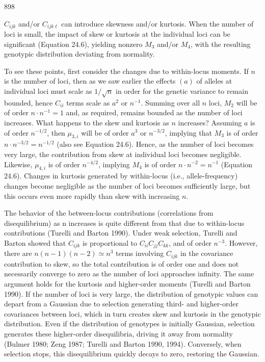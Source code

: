 \documentclass{article}
\begin{document}
898

 $ C_{ijk} $ and/or  $ C_{ijk\ell} $ can introduce skewness and/or kurtosis. When the number of loci is small, the impact of skew or kurtosis at the individual loci can be significant (Equation 24.6), yielding nonzero  $ M_3 $ and/or  $ M_4 $, with the resulting genotypic distribution deviating from normality.

To see these points, first consider the changes due to within-locus moments. If  $ n $ is the number of loci, then as we saw earlier the effects  $ (a) $ of alleles at individual loci must scale as  $ 1/\sqrt{n} $ in order for the genetic variance to remain bounded, hence  $ C_{ii} $ terms scale as  $ a^2 $ or  $ n^{-1} $. Summing over all  $ n $ loci,  $ M_2 $ will be of order  $ n \cdot n^{-1} = 1 $ and, as required, remains bounded as the number of loci increases. What happens to the skew and kurtosis as  $ n $ increases? Assuming  $ a $ is of order  $ n^{-1/2} $, then  $ \mu_{3,i} $ will be of order  $ a^3 $ or  $ n^{-3/2} $, implying that  $ M_3 $ is of order  $ n \cdot n^{-3/2} = n^{-1/2} $ (also see Equation 24.6). Hence, as the number of loci becomes very large, the contribution from skew at individual loci becomes negligible. Likewise,  $ \mu_{4,i} $ is of order  $ n^{-4/2} $, implying  $ M_4 $ is of order  $ n \cdot n^{-2} = n^{-1} $ (Equation 24.6). Changes in kurtosis generated by within-locus (i.e., allele-frequency) changes become negligible as the number of loci becomes sufficiently large, but this occurs even more rapidly than skew with increasing  $ n $.

The behavior of the between-locus contributions (correlations from disequilibrium) as n increases is quite different from that due to within-locus contributions (Turelli and Barton 1990). Under weak selection, Turelli and Barton showed that  $ C_{ijk} $ is proportional to  $ C_{ii}C_{jj}C_{kk} $, and of order  $ n^{-3} $. However, there are  $ n(n-1)(n-2) \simeq n^{3} $ terms involving  $ C_{ijk} $ in the covariance contribution to skew, so the total contribution is of order one and does not necessarily converge to zero as the number of loci approaches infinity. The same argument holds for the kurtosis and higher-order moments (Turelli and Barton 1990). If the number of loci is very large, the distribution of genotypic values can depart from a Gaussian due to selection generating third- and higher-order covariances between loci, which in turn creates skew and kurtosis in the genotypic distribution. Even if the distribution of genotypes is initially Gaussian, selection generates these higher-order disequilibria, driving it away from normality (Bulmer 1980; Zeng 1987; Turelli and Barton 1990, 1994). Conversely, when selection stops, this disequilibrium quickly decays to zero, restoring the Gaussian.
\end{document}
